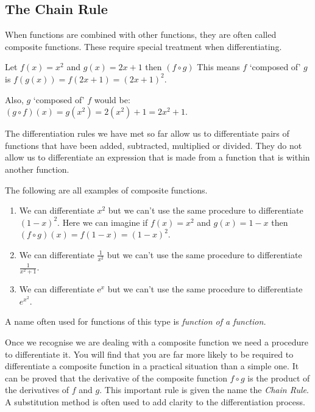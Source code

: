 \subsection*{The Chain Rule}
When functions are combined with other functions, they are often called composite functions. These require special treatment when differentiating.

Let $f (x) =x^{2}$ and $g (x) =2 x +1$ then $\left (f \circ g\right )$ This means $f$ `composed of' $g$ is $f \left (g \left (x\right )\right ) =f (2 x +1) =\left (2 x +1\right )^{2}$.

Also, $g$ `composed of' $f$ would be: $\left (g \circ f\right ) (x) =g \left (x^{2}\right ) =2 \left (x^{2}\right ) +1 =2 x^{2} +1$.

The differentiation rules we have met so far allow us to differentiate pairs of functions that have been added, subtracted, multiplied or divided. They do not allow us to differentiate an expression that is made from a function that is within another function.

The following are all examples of composite functions.
\begin{enumerate}
\item We can differentiate $x^{2}$ but we can't use the same procedure to differentiate $\left (1 -x\right )^{2}$. Here we can imagine if  $f (x) =x^{2}$ and $g (x) =1 -x$ then $\left (f \circ g\right ) (x) =f (1 -x) =\left (1 -x\right )^{2}$.

\item We can differentiate $\frac{1}{x^{2}}$ but we can't use the same procedure to differentiate $\frac{1}{x^{2} +1}$.

\item We can differentiate e$^{x}$ but we can't use the same procedure to differentiate $e^{x^{2}}$.
\end{enumerate}

A name often used for functions of this type is \emph{function of a function.}

Once we recognise we are dealing with a composite function we need a procedure to differentiate it. You will find that you are far more likely to be required to differentiate a composite function in a practical situation than a simple one. It can be proved that the derivative of the composite function $f \circ g$ is the product of the derivatives of $f$ and $g$. This important rule is given the name the \emph{Chain Rule}. A substitution method is often used to add clarity to the differentiation process.

